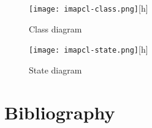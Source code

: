 \documentclass[a4]{report}
\begin{document}
\begin{figure}
  \centering
  \texttt{[image: imapcl-class.png]}[h]
  \caption{Class diagram}
  \label{class}
\end{figure}

\begin{figure}
  \centering
  \texttt{[image: imapcl-state.png]}[h]
  \caption{State diagram}
  \label{state}
\end{figure}

\chapter{Bibliography}

\printbibliography
\end{document}
